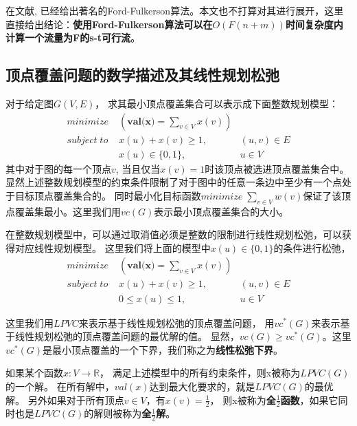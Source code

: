 在文献\cite{ford1962flows}, 已经给出著名的Ford-Fulkerson算法。本文也不打算对其进行展开，这里直接给出结论：\textbf{使用Ford-Fulkerson算法可以在$O(F(n + m))$时间复杂度内计算一个流量为F的s-t可行流}。

\subsection{顶点覆盖问题的数学描述及其线性规划松弛}
对于给定图$G(V, E)$， 求其最小顶点覆盖集合可以表示成下面整数规划模型：
\begin{equation} \label{ModelLPVC1} \begin{aligned}
  minimize\; & (\textbf{val(x)} = \sum_{v \in V}{x(v)}) &\\
  subject\; to\; & x(u) + x(v) \ge 1, &(u, v) \in E \\
   & x(u) \in \{0, 1\}, & u \in V
\end{aligned} \end{equation}
其中对于图的每一个顶点$v$, 当且仅当$x(v) = 1$时该顶点被选进顶点覆盖集合中。
显然上述整数规划模型的约束条件限制了对于图中的任意一条边中至少有一个点处于目标顶点覆盖集合的。
同时最小化目标函数$minimize\; \sum_{v \in V}{w(v)}$保证了该顶点覆盖集最小。这里我们用$vc(G)$表示最小顶点覆盖集合的大小。

在整数规划模型中，可以通过取消值必须是整数的限制进行线性规划松弛，可以获得对应线性规划模型。
这里我们将上面的模型中$x(u) \in \{0, 1\}$的条件进行松弛，
\begin{equation} \begin{aligned}
  minimize\; & (\textbf{val(x)} = \sum_{v \in V}{x(v)}) &\\
  subject\; to\; & x(u) + x(v) \ge 1, &(u, v) \in E \\
   & 0 \le x(u) \le 1, & u \in V
\end{aligned} \end{equation}

这里我们用$LPVC$来表示基于线性规划松弛的顶点覆盖问题，
用$vc^{*}(G)$来表示基于线性规划松弛的顶点覆盖问题的最优解的值。
显然，$vc(G) \ge vc^*(G)$。这里$vc^{*}(G)$是最小顶点覆盖的一个下界，我们称之为\textbf{线性松弛下界}。

如果某个函数$x:V \rightarrow \mathbb{R}$， 满足上述模型中的所有约束条件，则x被称为$LPVC(G)$的一个解。
在所有解中，$val(x)$达到最大化要求的，就是$LPVC(G)$的最优解。
另外如果对于所有顶点$v \in V$，有$x(v) = \frac{1}{2}$，
则x被称为\textbf{全$\frac{1}{2}$函数}，如果它同时也是$LPVC(G)$的解则被称为\textbf{全$\frac{1}{2}$解}。



